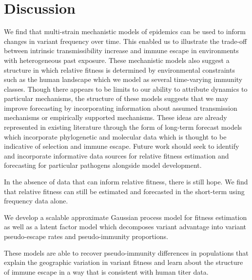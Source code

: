 \documentclass[12pt,oneside,letterpaper]{article}
\begin{document}
\section*{Discussion}







We find that multi-strain mechanistic models of epidemics can be used to inform changes in variant frequency over time.
This enabled us to illustrate the trade-off between intrinsic transmissibility increase and immune escape in environments with heterogeneous past exposure.
These mechanistic models also suggest a structure in which relative fitness is determined by environmental constraints such as the human landscape which we model as several time-varying immunity classes.
Though there appears to be limits to our ability to attribute dynamics to particular mechanisms, the structure of these models suggests that we may improve forecasting by incorporating information about assumed transmission mechanisms or empirically supported mechanisms.
These ideas are already represented in existing literature through the form of long-term forecast models which incorporate phylogenetic and molecular data which is thought to be indicative of selection and immune escape. \cite{Huddleston2020, luksza2014predictive}
Future work should seek to identify and incorporate informative data sources for relative fitness estimation and forecasting for particular pathogens alongside model development.

In the absence of data that can inform relative fitness, there is still hope.
We find that relative fitness can still be estimated and forecasted in the short-term using frequency data alone.

We develop a scalable approximate Gaussian process model for fitness estimation as well as a latent factor model which decomposes variant advantage into variant pseudo-escape rates and pseudo-immunity proportions.

These models are able to recover pseudo-immunity differences in populations that explain the geographic variation in variant fitness and learn about the structure of immune escape in a way that is consistent with human titer data.
\end{document}
